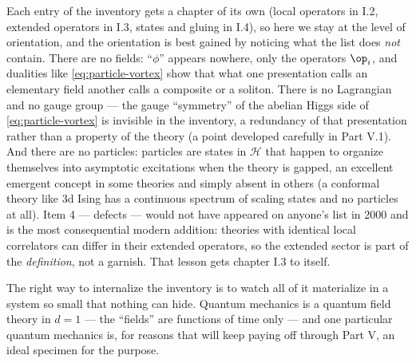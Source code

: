 Each entry of the inventory gets a chapter of its own (local operators in I.2,
extended operators in I.3, states and gluing in I.4), so here we stay at the
level of orientation, and the orientation is best gained by noticing what the
list does \emph{not} contain. There are no fields: ``$\phi$'' appears nowhere,
only the operators $\op_i$, and dualities like \eqref{eq:particle-vortex} show
that what one presentation calls an elementary field another calls a composite
or a soliton. There is no Lagrangian and no gauge group --- the gauge
``symmetry'' of the abelian Higgs side of \eqref{eq:particle-vortex} is
invisible in the inventory, a redundancy of that presentation rather than a
property of the theory (a point developed carefully in Part V.1). And there are
no particles: particles are states in $\mathcal{H}$ that happen to organize
themselves into asymptotic excitations when the theory is gapped, an excellent
emergent concept in some theories and simply absent in others (a conformal
theory like 3d Ising has a continuous spectrum of scaling states and no
particles at all). Item 4 --- defects --- would not have appeared on anyone's
list in 2000 and is the most consequential modern addition: theories with
identical local correlators can differ in their extended operators, so the
extended sector is part of the \emph{definition}, not a garnish. That lesson
gets chapter I.3 to itself.

The right way to internalize the inventory is to watch all of it materialize in
a system so small that nothing can hide. Quantum mechanics is a quantum field
theory in $d = 1$ --- the ``fields'' are functions of time only --- and one
particular quantum mechanics is, for reasons that will keep paying off through
Part V, an ideal specimen for the purpose.

